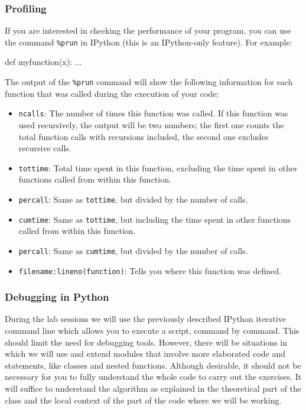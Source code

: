 \subsubsection{Profiling}

If you are interested in checking the performance of your program, you can use the command \texttt{\%prun} in IPython (this is an IPython-only feature). For example:

\begin{python}
def myfunction(x):
    ...

\end{python}

The output of the \texttt{\%prun} command will show the following information for each function that was called during the execution of your code:

\begin{itemize}
\item \texttt{ncalls}: The number of times this function was called. If this function was used recursively, the output will be two numbers; the first one counts the total function calls with recursions included, the second one excludes recursive calls.
\item \texttt{tottime}: Total time spent in this function, excluding the time spent in other functions called from within this function.
\item \texttt{percall}: Same as \texttt{tottime}, but divided by the number of calls.
\item \texttt{cumtime}: Same as \texttt{tottime}, but including the time spent in other functions called from within this function.
\item \texttt{percall}: Same as \texttt{cumtime}, but divided by the number of calls.
\item \texttt{filename:lineno(function)}: Tells you where this function was defined.
\end{itemize}

\subsubsection{Debugging in Python}

During the lab sessions we will use the previously described IPython iterative command line which allows you to execute a script, command by command. This should limit the need for debugging tools. However, there will be situations in which we will use and extend modules that involve more elaborated code and statements, like classes and nested functions. Although desirable, it should not be necessary for you to fully understand the whole code to carry out the exercises. It will suffice to understand the algorithm as explained in the theoretical part of the class and the local context of the part of the code where we will be working. 


